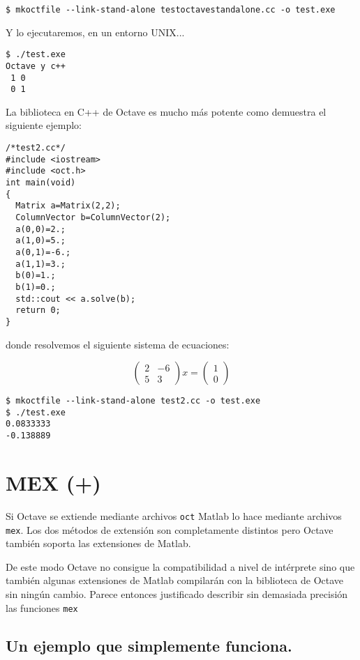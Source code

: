 \begin{verbatim}
$ mkoctfile --link-stand-alone testoctavestandalone.cc -o test.exe
\end{verbatim}
Y lo ejecutaremos, en un entorno UNIX...

\begin{verbatim}
$ ./test.exe
Octave y c++
 1 0
 0 1
\end{verbatim}

La biblioteca en C++ de Octave es mucho más potente como demuestra el
siguiente ejemplo:

\begin{verbatim}
/*test2.cc*/
#include <iostream>
#include <oct.h>
int main(void)
{
  Matrix a=Matrix(2,2);
  ColumnVector b=ColumnVector(2);
  a(0,0)=2.;
  a(1,0)=5.;
  a(0,1)=-6.;
  a(1,1)=3.;
  b(0)=1.;
  b(1)=0.;
  std::cout << a.solve(b);
  return 0;
}
\end{verbatim}
donde resolvemos el siguiente sistema de ecuaciones:

$$
\left(\begin{array}{cc}
    2 & -6\\
    5 & 3\end{array}\right)x= \left(\begin{array}{c}
    1\\
    0\end{array}\right)$$


\begin{verbatim}
$ mkoctfile --link-stand-alone test2.cc -o test.exe
$ ./test.exe 
0.0833333 
-0.138889 
\end{verbatim}

\section{MEX  (+)}

Si Octave se extiende mediante archivos \texttt{oct} Matlab lo hace
mediante archivos \texttt{mex}. Los dos métodos de extensión son
completamente distintos pero Octave también soporta las extensiones de
Matlab.

De este modo Octave no consigue la compatibilidad a nivel de
intérprete sino que también algunas extensiones de Matlab compilarán
con la biblioteca de Octave sin ningún cambio. Parece entonces
justificado describir sin demasiada precisión las funciones
\texttt{mex}

\subsection{Un ejemplo que simplemente funciona.}

